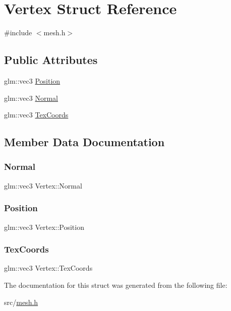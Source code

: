 \hypertarget{structVertex}{}\section{Vertex Struct Reference}
\label{structVertex}


{\ttfamily \#include $<$mesh.\+h$>$}

\subsection*{Public Attributes}
\begin{DoxyCompactItemize}
\item 
glm\+::vec3 \hyperlink{structVertex_abb3cfacd96b5955b0cec9359840ee49f}{Position}
\item 
glm\+::vec3 \hyperlink{structVertex_a9ab4dc431b41509f0b1bb1a4bf09d4e2}{Normal}
\item 
glm\+::vec3 \hyperlink{structVertex_a559b1c0085e92418f4604bfbd0cf7364}{Tex\+Coords}
\end{DoxyCompactItemize}


\subsection{Member Data Documentation}
\mbox{\label{structVertex_a9ab4dc431b41509f0b1bb1a4bf09d4e2}} 
\subsubsection{\texorpdfstring{Normal}{Normal}}
{\footnotesize\ttfamily glm\+::vec3 Vertex\+::\+Normal}

\mbox{\label{structVertex_abb3cfacd96b5955b0cec9359840ee49f}} 
\subsubsection{\texorpdfstring{Position}{Position}}
{\footnotesize\ttfamily glm\+::vec3 Vertex\+::\+Position}

\mbox{\label{structVertex_a559b1c0085e92418f4604bfbd0cf7364}} 
\subsubsection{\texorpdfstring{Tex\+Coords}{TexCoords}}
{\footnotesize\ttfamily glm\+::vec3 Vertex\+::\+Tex\+Coords}



The documentation for this struct was generated from the following file\+:\begin{DoxyCompactItemize}
\item 
src/\hyperlink{mesh_8h}{mesh.\+h}\end{DoxyCompactItemize}
